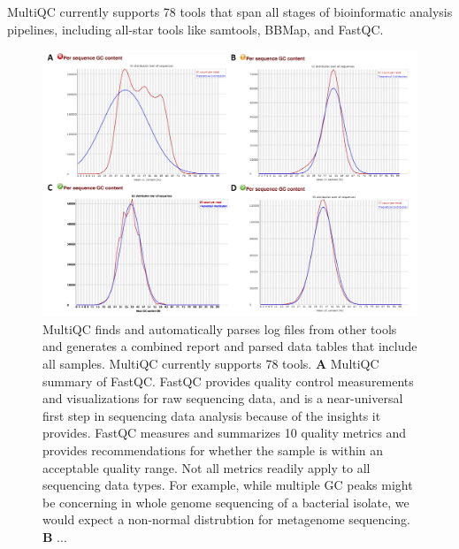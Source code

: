 \documentclass[10pt,letterpaper]{article}
\begin{document}
MultiQC currently supports 78 tools that span all stages of bioinformatic analysis pipelines, including all-star tools like samtools, BBMap, and FastQC. 
\begin{figure}
\includegraphics[width=.9\textwidth]{figures/fastqc.png}
\caption{MultiQC finds and automatically parses log files from other tools and generates a combined report and parsed data tables that include all samples. MultiQC currently supports 78 tools. \textbf{A} MultiQC summary of FastQC. FastQC provides quality control measurements and visualizations for raw sequencing data, and is a near-universal first step in sequencing data analysis because of the insights it provides. FastQC measures and summarizes 10 quality metrics and provides recommendations for whether the sample is within an acceptable quality range. Not all metrics readily apply to all sequencing data types. For example, while multiple GC peaks might be concerning in whole genome sequencing of a bacterial isolate, we would expect a non-normal distrubtion for metagenome sequencing. \textbf{B} ...} 
\label{fig:multiqc}
\end{figure}


\end{document}
